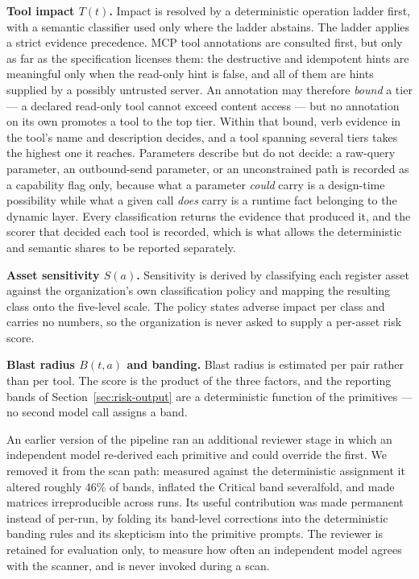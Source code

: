 \documentclass[sigconf]{acmart}
\begin{document}
\textbf{Tool impact $T(t)$.} Impact is resolved by a deterministic operation
ladder first, with a semantic classifier used only where the ladder abstains.
The ladder applies a strict evidence precedence. MCP tool annotations are
consulted first, but only as far as the specification licenses them: the
destructive and idempotent hints are meaningful only when the read-only hint is
false, and all of them are hints supplied by a possibly untrusted server. An
annotation may therefore \emph{bound} a tier --- a declared read-only tool
cannot exceed content access --- but no annotation on its own promotes a tool
to the top tier. Within that bound, verb evidence in the tool's name and
description decides, and a tool spanning several tiers takes the highest one it
reaches. Parameters describe but do not decide: a raw-query parameter, an
outbound-send parameter, or an unconstrained path is recorded as a capability
flag only, because what a parameter \emph{could} carry is a design-time
possibility while what a given call \emph{does} carry is a runtime fact
belonging to the dynamic layer. Every classification returns the evidence that
produced it, and the scorer that decided each tool is recorded, which is what
allows the deterministic and semantic shares to be reported separately.

\textbf{Asset sensitivity $S(a)$.} Sensitivity is derived by classifying each
register asset against the organization's own classification policy and mapping
the resulting class onto the five-level scale. The policy states adverse impact
per class and carries no numbers, so the organization is never asked to supply
a per-asset risk score.

\textbf{Blast radius $B(t,a)$ and banding.} Blast radius is estimated per pair
rather than per tool. The score is the product of the three factors, and the
reporting bands of Section~\ref{sec:risk-output} are a deterministic function of
the primitives --- no second model call assigns a band.

An earlier version of the pipeline ran an additional reviewer stage in which an
independent model re-derived each primitive and could override the first. We
removed it from the scan path: measured against the deterministic assignment it
altered roughly 46\% of bands, inflated the Critical band severalfold, and made
matrices irreproducible across runs. Its useful contribution was made permanent
instead of per-run, by folding its band-level corrections into the deterministic
banding rules and its skepticism into the primitive prompts. The reviewer is
retained for evaluation only, to measure how often an independent model agrees
with the scanner, and is never invoked during a scan.
\end{document}

